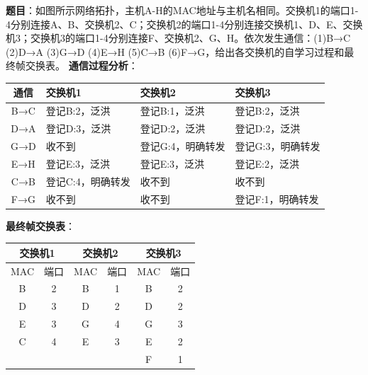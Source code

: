 \begin{examplebox}
\textbf{题目}：如图所示网络拓扑，主机A-H的MAC地址与主机名相同。交换机1的端口1-4分别连接A、B、交换机2、C；交换机2的端口1-4分别连接交换机1、D、E、交换机3；交换机3的端口1-4分别连接F、交换机2、G、H。依次发生通信：(1)B→C (2)D→A (3)G→D (4)E→H (5)C→B (6)F→G，给出各交换机的自学习过程和最终帧交换表。
\tcblower
\textbf{通信过程分析}：

\begin{center}\small
\begin{tabular}{|c|l|l|l|}
\hline
\textbf{通信} & \textbf{交换机1} & \textbf{交换机2} & \textbf{交换机3} \\
\hline
B→C & 登记B:2，泛洪 & 登记B:1，泛洪 & 登记B:2，泛洪 \\
D→A & 登记D:3，泛洪 & 登记D:2，泛洪 & 登记D:2，泛洪 \\
G→D & 收不到 & 登记G:4，明确转发 & 登记G:3，明确转发 \\
E→H & 登记E:3，泛洪 & 登记E:3，泛洪 & 登记E:2，泛洪 \\
C→B & 登记C:4，明确转发 & 收不到 & 收不到 \\
F→G & 收不到 & 收不到 & 登记F:1，明确转发 \\
\hline
\end{tabular}
\end{center}

\textbf{最终帧交换表}：
\begin{center}\small
\begin{tabular}{|c|c||c|c||c|c|}
\hline
\multicolumn{2}{|c||}{\textbf{交换机1}} & \multicolumn{2}{c||}{\textbf{交换机2}} & \multicolumn{2}{c|}{\textbf{交换机3}} \\
\hline
MAC & 端口 & MAC & 端口 & MAC & 端口 \\
\hline
B & 2 & B & 1 & B & 2 \\
D & 3 & D & 2 & D & 2 \\
E & 3 & G & 4 & G & 3 \\
C & 4 & E & 3 & E & 2 \\
  &   &   &   & F & 1 \\
\hline
\end{tabular}
\end{center}
\end{examplebox}

